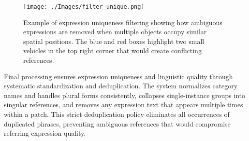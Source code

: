 \begin{figure}[H]
\centering
\begin{minipage}{0.5\textwidth}
\centering
\texttt{[image: ./Images/filter\_unique.png]}
\end{minipage}%
\begin{minipage}{0.5\textwidth}
\centering
\hspace{-1cm}
\end{minipage}
\caption{Example of expression uniqueness filtering showing how ambiguous expressions are removed when multiple objects occupy similar spatial positions. The blue and red boxes highlight two small vehicles in the top right corner that would create conflicting references.}
\label{fig:uniqueness_filter}
\end{figure}

Final processing ensures expression uniqueness and linguistic quality through systematic standardization and deduplication. The system normalizes category names and handles plural forms consistently, collapses single-instance groups into singular references, and removes any expression text that appears multiple times within a patch. This strict deduplication policy eliminates all occurrences of duplicated phrases, preventing ambiguous references that would compromise referring expression quality.


